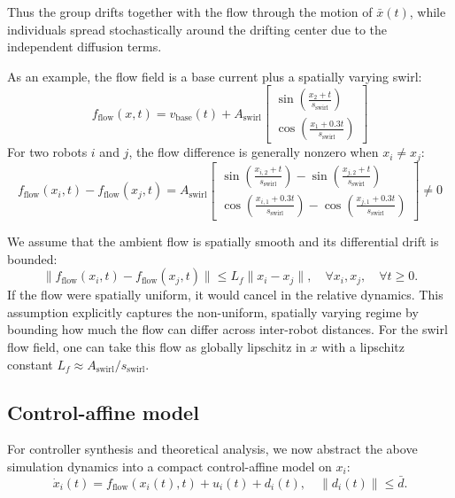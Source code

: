\documentclass[conference]{IEEEconf}
\theoremstyle{plain}
\begin{document}
Thus the group drifts together with the flow through the motion of $\bar{x}(t)$, while individuals spread stochastically around the drifting center due to the independent diffusion terms.

As an example, the flow field is a base current plus a spatially varying swirl:
\begin{equation*}
f_{\text{flow}}(x,t) = v_{\text{base}}(t) + A_{\text{swirl}}
\begin{bmatrix}
    \sin \! \left( \tfrac{x_2 + t}{s_{\text{swirl}}} \right) \\
    \cos \! \left( \tfrac{x_1 + 0.3t}{s_{\text{swirl}}} \right)
\end{bmatrix}
\end{equation*}
For two robots $i$ and $j$, the flow difference is generally nonzero when $x_{i} \neq x_{j}$:
\begin{equation*}
f_{\text{flow}}(x_i, t) - f_{\text{flow}}(x_j, t) = A_{\text{swirl}}
\left[ \begin{smallmatrix}
    \sin \! \left( \frac{x_{i,2} + t}{s_{\text{swirl}}} \right) - \sin \! \left( \frac{x_{j,2} + t}{s_{\text{swirl}}} \right) \\
    \cos \! \left( \frac{x_{i,1} + 0.3t}{s_{\text{swirl}}} \right) - \cos \! \left( \frac{x_{j,1} + 0.3t}{s_{\text{swirl}}} \right)
\end{smallmatrix} \right] \neq 0
\end{equation*}

We assume that the ambient flow is spatially smooth and its differential drift is bounded:
$$
\|f_{\text{flow}}(x_i, t) - f_{\text{flow}}(x_j, t)\| \le L_f \|x_i - x_j\|, \quad \forall x_i, x_j, \quad \forall t \ge 0.
$$
If the flow were spatially uniform, it would cancel in the relative dynamics. This assumption explicitly captures the non-uniform, spatially varying regime by bounding how much the flow can differ across inter-robot distances. For the swirl flow field, one can take this flow as globally lipschitz in $x$ with a lipschitz constant $L_f \approx A_{\text{swirl}} / s_{\text{swirl}}$.

\subsection{Control-affine model}
For controller synthesis and theoretical analysis, we now abstract the above simulation dynamics into a compact control-affine model on $x_i$:
\begin{equation}\label{eq:adv-dif}
\dot{x}_i(t) = f_{\text{flow}}(x_i(t),t) + u_i(t) + d_i(t), \quad \|d_i(t)\|\le \bar d.
\end{equation}
\end{document}
